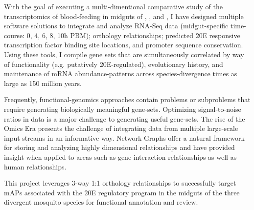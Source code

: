 \thesisabstract
{
With the goal of executing a multi-dimentional comparative study of the transcriptomics of blood-feeding in midguts of \Aea, \Ang, and \Cxq, I have designed multiple software solutions to integrate and analyze \gls{RNA-Seq} data (midgut-specific time-course: 0, 4, 6, 8, 10h \gls{PBM}); orthology relationships; predicted \gls{20E} responsive transcription factor binding site locations, and promoter sequence conservation.
Using these tools, I compile gene sets that are simultaneously correlated by way of functionality (e.g. putatively \gls{20E}-regulated), evolutionary history, and maintenance of mRNA abundance-patterns across species-divergence times as large as 150 million years.  

Frequently, \gls{functional-genomics} approaches contain problems or subproblems that require generating biologically meaningful gene-sets.
Optimizing signal-to-noise ratios in data is a major challenge to generating useful gene-sets.
The rise of the Omics Era presents the challenge of integrating data from multiple large-scale input streams in an informative way.
Network Graphs offer a natural framework for storing and analyzing highly dimensional relationships and have provided insight when applied to areas such as gene interaction relationships as well as human relationships.

This project leverages 3-way 1:1 orthology relationships to successfully target \glspl{mAP} associated with the \gls{20E} regulatory program in the midguts of the three divergent mosquito species for functional annotation and review.
}


